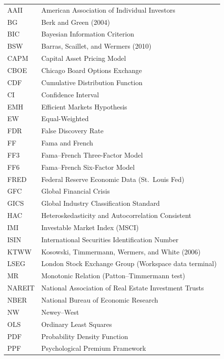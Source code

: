 \documentclass[12pt, oneside]{report}
\newif\ifsbeplainlist   %
\begin{document}
\sbeplainlisttrue
\begin{longtable}{@{}ll@{}}
\endhead
AAII      & American Association of Individual Investors \\
BG        & Berk and Green (2004) \\
BIC       & Bayesian Information Criterion \\
BSW       & Barras, Scaillet, and Wermers (2010) \\
CAPM      & Capital Asset Pricing Model \\
CBOE      & Chicago Board Options Exchange \\
CDF       & Cumulative Distribution Function \\
CI        & Confidence Interval \\
EMH       & Efficient Markets Hypothesis \\
EW        & Equal-Weighted \\
FDR       & False Discovery Rate \\
FF        & Fama and French \\
FF3       & Fama--French Three-Factor Model \\
FF6       & Fama--French Six-Factor Model \\
FRED      & Federal Reserve Economic Data (St.\ Louis Fed) \\
GFC       & Global Financial Crisis \\
GICS      & Global Industry Classification Standard \\
HAC       & Heteroskedasticity and Autocorrelation Consistent \\
IMI       & Investable Market Index (MSCI) \\
ISIN      & International Securities Identification Number \\
KTWW      & Kosowski, Timmermann, Wermers, and White (2006) \\
LSEG      & London Stock Exchange Group (Workspace data terminal) \\
MR        & Monotonic Relation (Patton--Timmermann test) \\
NAREIT    & National Association of Real Estate Investment Trusts \\
NBER      & National Bureau of Economic Research \\
NW        & Newey--West \\
OLS       & Ordinary Least Squares \\
PDF       & Probability Density Function \\
PPF       & Psychological Premium Framework \\

\end{longtable}
\end{document}
